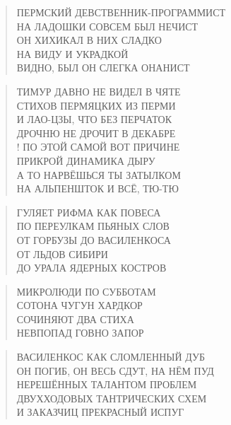 \poemtitle{***}
\begin{verse}
ПЕРМСКИЙ ДЕВСТВЕННИК-ПРОГРАММИСТ\\
НА ЛАДОШКИ СОВСЕМ БЫЛ НЕЧИСТ\\
ОН ХИХИКАЛ В НИХ СЛАДКО\\
НА ВИДУ И УКРАДКОЙ\\
ВИДНО, БЫЛ ОН СЛЕГКА ОНАНИСТ
\end{verse}

\poemtitle{***}
\begin{verse}
ТИМУР ДАВНО НЕ ВИДЕЛ В ЧЯТЕ\\
СТИХОВ ПЕРМЯЦКИХ ИЗ ПЕРМИ\\
И ЛАО-ЦЗЫ, ЧТО БЕЗ ПЕРЧАТОК\\
ДРОЧНЮ НЕ ДРОЧИТ В ДЕКАБРЕ\\!
ПО ЭТОЙ САМОЙ ВОТ ПРИЧИНЕ\\
ПРИКРОЙ ДИНАМИКА ДЫРУ\\
А ТО НАРВЁШЬСЯ ТЫ ЗАТЫЛКОМ\\
НА АЛЬПЕНШТОК И ВСЁ, ТЮ-ТЮ
\end{verse}

\poemtitle{***}
\begin{verse}
ГУЛЯЕТ РИФМА КАК ПОВЕСА\\
ПО ПЕРЕУЛКАМ ПЬЯНЫХ СЛОВ\\
ОТ ГОРБУЗЫ ДО ВАСИЛЕНКОСА\\
ОТ ЛЬДОВ СИБИРИ \\
ДО УРАЛА ЯДЕРНЫХ КОСТРОВ
\end{verse}

\poemtitle{***}
\begin{verse}
МИКРОЛЮДИ ПО СУББОТАМ \\
СОТОНА ЧУГУН ХАРДКОР\\
СОЧИНЯЮТ ДВА СТИХА\\
НЕВПОПАД ГОВНО ЗАПОР
\end{verse}

\poemtitle{***}
\begin{verse}
ВАСИЛЕНКОС КАК СЛОМЛЕННЫЙ ДУБ\\
ОН ПОГИБ, ОН ВЕСЬ СДУТ, НА НЁМ ПУД\\
НЕРЕШЁННЫХ ТАЛАНТОМ ПРОБЛЕМ\\
ДВУХХОДОВЫХ ТАНТРИЧЕСКИХ СХЕМ\\
И ЗАКАЗЧИЦ ПРЕКРАСНЫЙ ИСПУГ
\end{verse}

